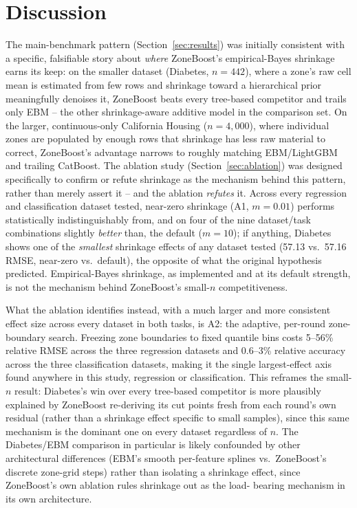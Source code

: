 \documentclass[11pt]{article}
\begin{document}
\section{Discussion}
\label{sec:discussion}

The main-benchmark pattern (Section~\ref{sec:results}) was initially
consistent with a specific, falsifiable story about \emph{where}
ZoneBoost's empirical-Bayes shrinkage earns its keep: on the smaller
dataset (Diabetes, $n=442$), where a zone's raw cell mean is estimated from
few rows and shrinkage toward a hierarchical prior meaningfully denoises
it, ZoneBoost beats every tree-based competitor and trails only EBM -- the
other shrinkage-aware additive model in the comparison set. On the larger,
continuous-only California Housing ($n=4{,}000$), where individual zones
are populated by enough rows that shrinkage has less raw material to
correct, ZoneBoost's advantage narrows to roughly matching EBM/LightGBM
and trailing CatBoost. The ablation study (Section~\ref{sec:ablation}) was
designed specifically to confirm or refute shrinkage as the mechanism
behind this pattern, rather than merely assert it -- and the ablation
\emph{refutes} it. Across every regression and classification dataset
tested, near-zero shrinkage (A1, $m=0.01$) performs statistically
indistinguishably from, and on four of the nine dataset/task combinations
slightly \emph{better} than, the default ($m=10$); if anything, Diabetes
shows one of the \emph{smallest} shrinkage effects of any dataset tested
(57.13 vs.\ 57.16 RMSE, near-zero vs.\ default), the opposite of what the
original hypothesis predicted. Empirical-Bayes shrinkage, as implemented
and at its default strength, is not the mechanism behind ZoneBoost's
small-$n$ competitiveness.

What the ablation identifies instead, with a much larger and more
consistent effect size across every dataset in both tasks, is A2: the
adaptive, per-round zone-boundary search. Freezing zone boundaries to
fixed quantile bins costs 5--56\% relative RMSE across the three regression
datasets and 0.6--3\% relative accuracy across the three classification
datasets, making it the single largest-effect axis found anywhere in this
study, regression or classification. This reframes the small-$n$ result:
Diabetes's win over every tree-based competitor is more plausibly explained
by ZoneBoost re-deriving its cut points fresh from each round's own
residual (rather than a shrinkage effect specific to small samples), since
this same mechanism is the dominant one on every dataset regardless of
$n$. The Diabetes/EBM comparison in particular is likely confounded by
other architectural differences (EBM's smooth per-feature splines vs.\
ZoneBoost's discrete zone-grid steps) rather than isolating a shrinkage
effect, since ZoneBoost's own ablation rules shrinkage out as the load-
bearing mechanism in its own architecture.
\end{document}

